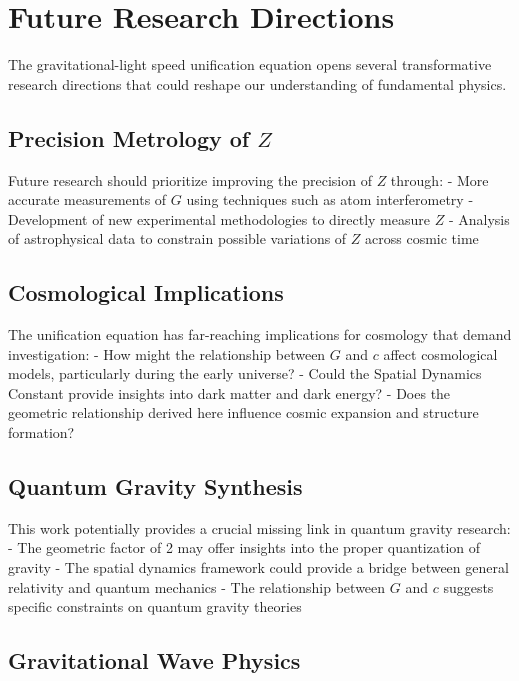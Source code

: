 \documentclass[nature,numbers]{article}
\begin{document}
\section{Future Research Directions}

The gravitational-light speed unification equation opens several transformative research directions that could reshape our understanding of fundamental physics.

\subsection{Precision Metrology of $Z$}

Future research should prioritize improving the precision of $Z$ through:
- More accurate measurements of $G$ using techniques such as atom interferometry\cite{fixler2007atom}
- Development of new experimental methodologies to directly measure $Z$
- Analysis of astrophysical data to constrain possible variations of $Z$ across cosmic time

\subsection{Cosmological Implications}

The unification equation has far-reaching implications for cosmology that demand investigation:
- How might the relationship between $G$ and $c$ affect cosmological models, particularly during the early universe?
- Could the Spatial Dynamics Constant provide insights into dark matter and dark energy?
- Does the geometric relationship derived here influence cosmic expansion and structure formation?

\subsection{Quantum Gravity Synthesis}

This work potentially provides a crucial missing link in quantum gravity research:
- The geometric factor of 2 may offer insights into the proper quantization of gravity
- The spatial dynamics framework could provide a bridge between general relativity and quantum mechanics
- The relationship between $G$ and $c$ suggests specific constraints on quantum gravity theories

\subsection{Gravitational Wave Physics}
\end{document}
